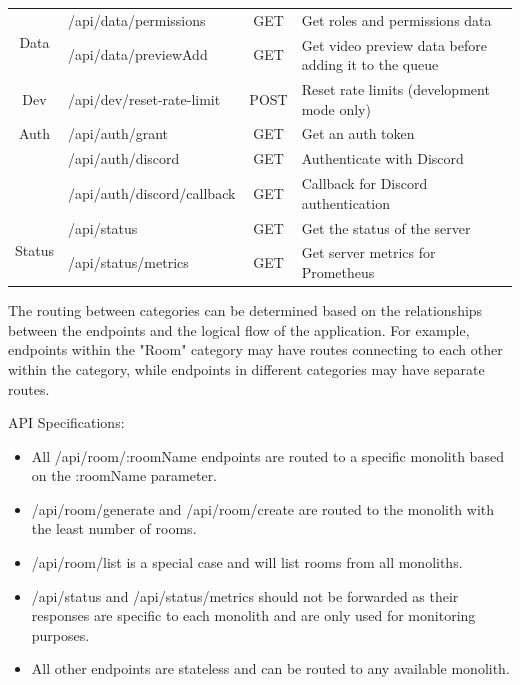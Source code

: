 \begin{table}[htbp]
\begin{tabular}{|c|l|c|p{5.5cm}|}
    \hline
    \multirow{2}{*}{Data} & /api/data/permissions & GET & Get roles and permissions data \\
    \cline{2-4}
    & /api/data/previewAdd & GET & Get video preview data before adding it to the queue \\
    \hline
    \multirow{1}{*}{Dev} & /api/dev/reset-rate-limit & POST & Reset rate limits (development mode only) \\
    \hline
    \multirow{1}{*}{Auth} & /api/auth/grant & GET & Get an auth token \\
    \cline{2-4}
    & /api/auth/discord & GET & Authenticate with Discord \\
    \cline{2-4}
    & /api/auth/discord/callback & GET & Callback for Discord authentication \\
    \hline
    \multirow{2}{*}{Status} & /api/status & GET & Get the status of the server \\
    \cline{2-4}
    & /api/status/metrics & GET & Get server metrics for Prometheus \\
    \hline
  \end{tabular}
\end{table}

The routing between categories can be determined based on the relationships between the endpoints and the logical flow of the application. For example, endpoints within the "Room" category may have routes connecting to each other within the category, while endpoints in different categories may have separate routes. 

API Specifications:
\begin{itemize}
  \item All /api/room/:roomName endpoints are routed to a specific monolith based on the :roomName parameter.
  \item /api/room/generate and /api/room/create are routed to the monolith with the least number of rooms.
  \item /api/room/list is a special case and will list rooms from all monoliths.
  \item /api/status and /api/status/metrics should not be forwarded as their responses are specific to each monolith and are only used for monitoring purposes.
  \item All other endpoints are stateless and can be routed to any available monolith.
\end{itemize}